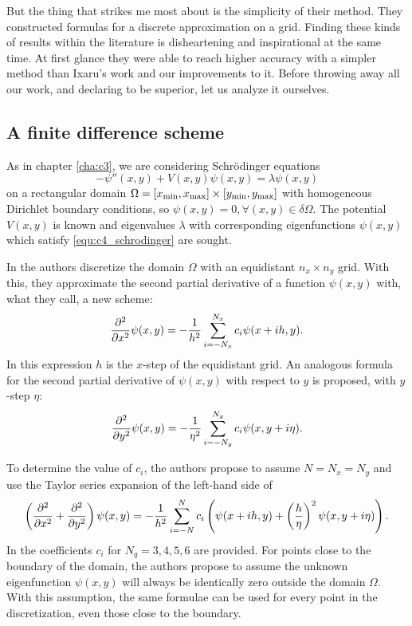 But the thing that strikes me most about \cite{wang_new_2009} is the simplicity of their method. They constructed formulas for a discrete approximation on a grid. Finding these kinds of results within the literature is disheartening and inspirational at the same time. At first glance they were able to reach higher accuracy with a simpler method than Ixaru's work \cite{ixaru_new_2010} and our improvements \cite{baeyens_improvements_2022} to it. Before throwing away all our work, and declaring \cite{wang_new_2009} to be superior, let us analyze it ourselves.

\subsection{A finite difference scheme}

As in chapter \ref{cha:c3}, we are considering Schrödinger equations
\begin{equation}\label{equ:c4_schrodinger}
    -\psi''(x, y) + V(x, y) \psi(x, y) = \lambda \psi(x, y)
\end{equation}
on a rectangular domain $\Omega = [{x_{\text{min}}}, {x_{\text{max}}}] \times [{y_{\text{min}}}, {y_{\text{max}}}]$ with homogeneous Dirichlet boundary conditions, so $\psi(x, y) = 0, \forall (x, y) \in \delta \Omega$. The potential $V(x, y)$ is known and eigenvalues $\lambda$ with corresponding eigenfunctions $\psi(x, y)$ which satisfy \eqref{equ:c4_schrodinger} are sought.

In \cite{wang_new_2009} the authors discretize the domain $\Omega$ with an equidistant $n_x \times n_y$ grid. With this, they approximate the second partial derivative of a function $\psi(x, y)$ with, what they call, a new scheme:
$$
    {\pdv[2]{}{x}}\psi(x, y) = -\frac{1}{h^2}\sum_{i=-N_x}^{N_x} c_i \psi(x + ih, y)\text{.}
$$
In this expression $h$ is the $x$-step of the equidistant grid. An analogous formula for the second partial derivative of $\psi(x, y)$ with respect to $y$ is proposed, with $y$-step $\eta$:
$$
    {\pdv[2]{}{y}}\psi(x, y) = -\frac{1}{\eta^2}\sum_{i=-N_y}^{N_y} c_i \psi(x, y + i\eta)\text{.}
$$

To determine the value of $c_i$, the authors propose to assume $N = N_x = N_y$ and use the Taylor series expansion of the left-hand side of
$$
    \left({\pdv[2]{}{x}} + {\pdv[2]{}{y}}\right)\psi(x, y) = -\frac{1}{h^2} \sum_{i=-N}^{N} c_i \left(\psi(x+ih, y) + \left(\frac{h}{\eta}\right)^2\psi(x, y+i\eta)\right)\text{.}
$$
In \cite{wang_new_2009} the coefficients $c_i$ for $N_q = 3, 4, 5, 6$ are provided. For points close to the boundary of the domain, the authors propose to assume the unknown eigenfunction $\psi(x, y)$ will always be identically zero outside the domain $\Omega$. With this assumption, the same formulae can be used for every point in the discretization, even those close to the boundary.

